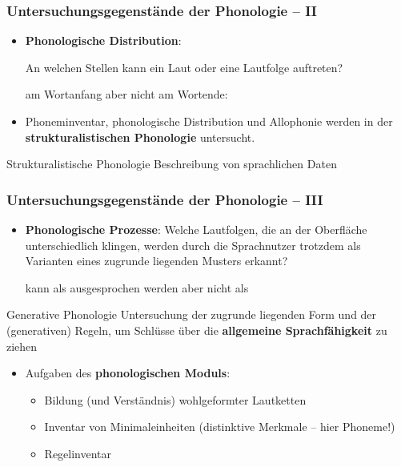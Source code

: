 \begin{frame}
\frametitle{Untersuchungsgegenstände der Phonologie -- II}

\begin{itemize}

		\item \textbf{Phonologische Distribution}:\par
		An welchen Stellen kann ein Laut oder eine Lautfolge auftreten?

	\ea \textipa{[St\textscr]} am Wortanfang aber nicht am Wortende:\\
	\textipa{[St{\textscr}\t{aU}x]} \vs *
	\z
	
	\item Phoneminventar, phonologische Distribution und Allophonie werden in der \textbf{strukturalistischen Phonologie} untersucht.

\end{itemize}

\begin{block}{Strukturalistische Phonologie}
	Beschreibung von sprachlichen Daten 
\end{block}

\end{frame}


\begin{frame}
\frametitle{Untersuchungsgegenstände der Phonologie -- III}
	
\begin{itemize}		
	\item \textbf{Phonologische Prozesse}: Welche Lautfolgen, die an der Oberfläche unterschiedlich klingen, werden durch die Sprachnutzer trotzdem als Varianten eines zugrunde liegenden Musters erkannt?

\ea \textipa{[ga{\textscr}t@n]} kann als \textipa{[ga:d\textsyllabic{n}]} ausgesprochen werden aber nicht als 
\textipa{[ga:b\s{m}]}
\z

\end{itemize}


\begin{block}{Generative Phonologie}
	Untersuchung der zugrunde liegenden Form und der (generativen) Regeln, um Schlüsse über die \textbf{allgemeine Sprachfähigkeit} zu ziehen
\end{block}

      
\begin{itemize}

\item Aufgaben des \textbf{phonologischen Moduls}:
	
	\begin{itemize}
		\item Bildung (und Verständnis) wohlgeformter Lautketten
		\item Inventar von Minimaleinheiten (distinktive Merkmale -- hier Phoneme!)
		\item Regelinventar
	\end{itemize}
	 
\end{itemize}

\end{frame}



